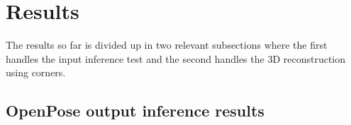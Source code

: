 \section{Results}\label{sec:results}


The results so far is divided up in two relevant subsections where the first handles the input inference test and the second handles the 3D reconstruction using \aruco corners.
\subsection{OpenPose output inference results}%
\label{sub:res:op_inference}



